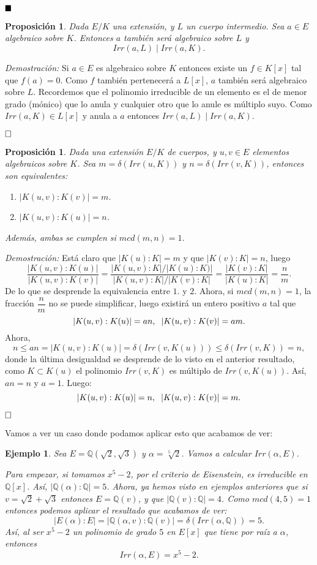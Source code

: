 \documentclass[12pt]{article}
\newtheorem{proposition}[theorem]{Proposición}
\newtheorem{example}{Ejemplo}[theorem]
\begin{document}
$\hfill \blacksquare$

\begin{proposition}\label{eq:pirrdiv} Dada $E/K$ una extensión, y $L$ un cuerpo intermedio. Sea $a \in E$ algebraico sobre $K$. Entonces $a$ también será algebraico sobre $L$ y $$Irr(a, L) \mid Irr (a, K).$$
\end{proposition}
\emph{Demostración: }Si $a \in E$ es algebraico sobre $K$ entonces existe un $f \in K[x]$ tal que $f(a) = 0$. Como $f$ también pertenecerá a $L[x]$, $a$ también será algebraico sobre $L$. Recordemos que el polinomio irreducible de un elemento es el de menor grado (mónico) que lo anula y cualquier otro que lo anule es múltiplo suyo. Como $Irr(a,K) \in L[x]$ y anula a $a$ entonces $Irr(a, L) \mid Irr(a,K)$.

$\hfill \square$

\begin{proposition} Dada una extensión $E/K$ de cuerpos, y $u,v \in E$ elementos algebraicos sobre $K$. Sea $m = \delta(Irr(u, K))$ y $n = \delta(Irr(v,K))$, entonces son equivalentes: \begin{enumerate}
\item $|K(u,v) :K(v) | = m$.
\item $|K(u,v) : K(u) | = n$.
\end{enumerate}
Además, ambas se cumplen si $mcd(m,n) = 1$.
\end{proposition}
\emph{Demostración: }
Está claro que $|K(u) : K| = m$ y que $|K(v) : K| = n$, luego $$\dfrac{|K(u,v):K(u)|}{|K(u,v):K(v)|} = \dfrac{|K(u,v):K|/|K(u):K)|}{|K(u,v):K|/|K(v):K|} = \dfrac{|K(v):K|}{|K(u):K|} = \dfrac{n}{m}.$$
De lo que se desprende la equivalencia entre $1.$ y $2.$ Ahora, si $mcd(m,n) = 1$, la fracción $\dfrac{n}{m}$ no se puede simplificar, luego existirá un entero positivo $a$ tal que $$|K(u,v):K(u)| = an, \hspace{0.2cm} |K(u,v):K(v)| = am.$$ Ahora, $$n \leq an = |K(u,v):K(u)| = \delta(Irr(v, K(u))) \leq \delta (Irr(v,K)) = n,$$ donde la última desigualdad se desprende de lo visto en el anterior resultado, como $K \subset K(u)$ el polinomio $Irr(v,K)$ es múltiplo de $Irr(v,K(u))$. Así, $an = n$ y $a = 1$. Luego: $$|K(u,v):K(u)| = n, \hspace{0.2cm} |K(u,v):K(v)| = m.$$


$\hfill \square$

Vamos a ver un caso donde podamos aplicar esto que acabamos de ver:
\begin{example} Sea $E = \mathbb{Q}(\sqrt{2}, \sqrt{3})$ y $\alpha = \sqrt[5]{2}$. Vamos a calcular $Irr(\alpha, E)$.

Para empezar, si tomamos $x^{5}-2$, por el criterio de Eisenstein, es irreducible en $\mathbb{Q}[x]$. Así, $|\mathbb{Q}(\alpha) : \mathbb{Q}| = 5$. Ahora, ya hemos visto en ejemplos anteriores que si $v = \sqrt{2}+ \sqrt{3}$ entonces $E = \mathbb{Q}(v)$, y que $|\mathbb{Q}(v) : \mathbb{Q}| = 4$. Como $mcd(4,5) = 1$ entonces podemos aplicar el resultado que acabamos de ver: $$|E(\alpha) : E| = |\mathbb{Q}(\alpha,v) : \mathbb{Q}(v) | = \delta (Irr(\alpha, \mathbb{Q})) = 5.$$ Así, al ser $x^{5}-2$ un polinomio de grado $5$ en $E[x]$ que tiene por raíz a $\alpha$, entonces $$Irr(\alpha, E) = x^{5}-2.$$
\end{example}
\end{document}
